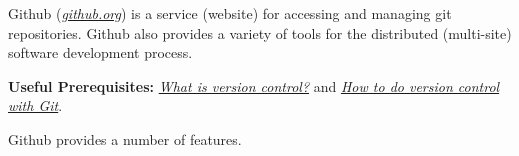 \documentclass[]{article}
\date{}
\begin{document}
\pagestyle{fancy}
\renewcommand{\headrulewidth}{0pt}
  
\thispagestyle{empty}
\textbf{\newline}

Github (\href{https://github.com/}{\emph{github.org}}) is a service
(website) for accessing and managing git repositories. Github also
provides a variety of tools for the distributed (multi-site) software
development process.

\textbf{Useful Prerequisites:}
\href{https://docs.google.com/document/d/1LHT4e-BjB31BcCSL42xSI5GBNCNpQ-SS5K5iyStH6sw/edit}{\emph{What
is version control?}} and
\href{https://docs.google.com/document/d/1mSrTdzZdLDz-YRquzABNhI87tGd_zP04ctyscmZ_Phw/edit}{\emph{How
to do version control with Git}}.

Github provides a number of features.
\end{document}
